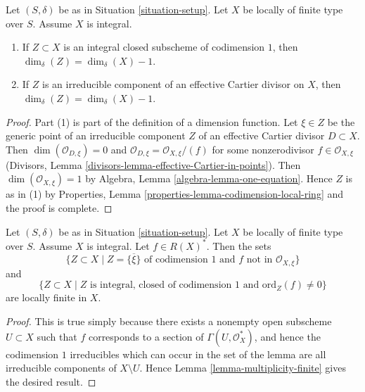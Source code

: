 \begin{lemma}
\label{lemma-divisor-delta-dimension}
Let $(S, \delta)$ be as in Situation \ref{situation-setup}.
Let $X$ be locally of finite type over $S$. Assume $X$ is
integral.
\begin{enumerate}
\item If $Z \subset X$ is an integral closed subscheme
of codimension $1$, then $\dim_\delta(Z) = \dim_\delta(X) - 1$.
\item If $Z$ is an irreducible component of an effective Cartier
divisor on $X$, then $\dim_\delta(Z) = \dim_\delta(X) - 1$.
\end{enumerate}
\end{lemma}

\begin{proof}
Part (1) is part of the definition of a dimension function.
Let $\xi \in Z$ be the generic point of an irreducible component $Z$ of
an effective Cartier divisor $D \subset X$.
Then $\dim(\mathcal{O}_{D, \xi}) = 0$ and
$\mathcal{O}_{D, \xi} = \mathcal{O}_{X, \xi}/(f)$ for some
nonzerodivisor $f \in \mathcal{O}_{X, \xi}$ (Divisors,
Lemma \ref{divisors-lemma-effective-Cartier-in-points}).
Then $\dim(\mathcal{O}_{X, \xi}) = 1$ by
Algebra, Lemma \ref{algebra-lemma-one-equation}. Hence $Z$ is as in (1) by
Properties, Lemma \ref{properties-lemma-codimension-local-ring}
and the proof is complete.
\end{proof}

\begin{lemma}
\label{lemma-divisor-locally-finite}
Let $(S, \delta)$ be as in Situation \ref{situation-setup}.
Let $X$ be locally of finite type over $S$. Assume $X$ is
integral. Let $f \in R(X)^*$. Then the sets
$$
\{Z \subset X \mid Z = \overline{\{\xi\}} \text{ of codimension }1
\text{ and }f\text{ not in }\mathcal{O}_{X, \xi}\}
$$
and
$$
\{Z \subset X \mid Z \text{ is integral, closed of codimension }1
\text{ and }\text{ord}_Z(f) \not = 0\}
$$
are locally finite in $X$.
\end{lemma}

\begin{proof}
This is true simply because there exists a nonempty open subscheme
$U \subset X$ such that $f$ corresponds to a section of
$\Gamma(U, \mathcal{O}_X^*)$, and hence the codimension $1$
irreducibles which can occur in the set of the lemma are all
irreducible components of $X \setminus U$.
Hence Lemma \ref{lemma-multiplicity-finite} gives the desired result.
\end{proof}

